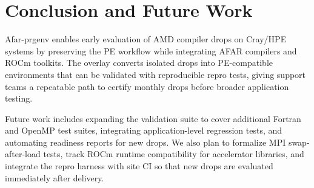 \section{Conclusion and Future Work}
\label{sec:conclusion}
Afar-prgenv enables early evaluation of AMD compiler drops on Cray/HPE systems
by preserving the PE workflow while integrating AFAR compilers and ROCm
toolkits. The overlay converts isolated drops into PE-compatible environments
that can be validated with reproducible repro tests, giving support teams a
repeatable path to certify monthly drops before broader application testing.

Future work includes expanding the validation suite to cover additional Fortran
and OpenMP test suites, integrating application-level regression tests, and
automating readiness reports for new drops.
We also plan to formalize MPI swap-after-load tests, track ROCm runtime
compatibility for accelerator libraries, and integrate the repro harness with
site CI so that new drops are evaluated immediately after delivery.
